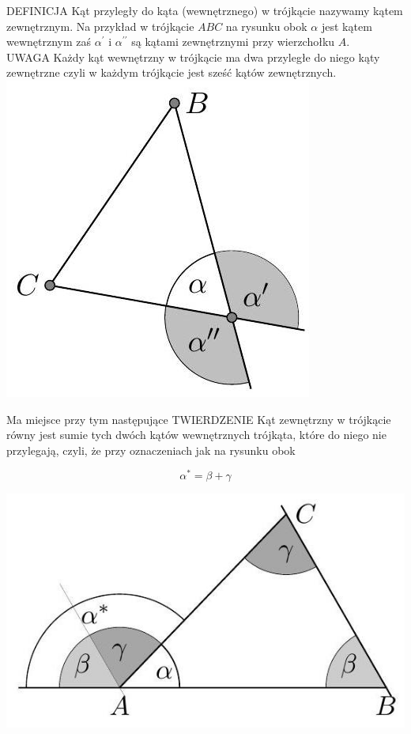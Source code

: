 \documentclass[10pt]{article}
\begin{document}
DEFINICJA Kąt przyległy do kąta (wewnętrznego) w trójkącie nazywamy kątem zewnętrznym. Na przykład w trójkącie \(A B C\) na rysunku obok \(\alpha\) jest kątem wewnętrznym zaś \(\alpha^{\prime}\) i \(\alpha^{\prime \prime}\) są kątami zewnętrznymi przy wierzchołku \(A\).\\
UWAGA Każdy kąt wewnętrzny w trójkącie ma dwa przyległe do niego kąty zewnętrzne czyli w każdym trójkącie jest sześć kątów zewnętrznych.\\
\includegraphics[max width=\textwidth, center]{2024_11_21_71f62bd117d375398909g-021(1)}

Ma miejsce przy tym następujące TWIERDZENIE Kąt zewnętrzny w trójkącie równy jest sumie tych dwóch kątów wewnętrznych trójkąta, które do niego nie przylegają, czyli, że przy oznaczeniach jak na rysunku obok

\[
\alpha^{*}=\beta+\gamma
\]

\begin{center}
\includegraphics[max width=\textwidth]{2024_11_21_71f62bd117d375398909g-022}
\end{center}
\end{document}
